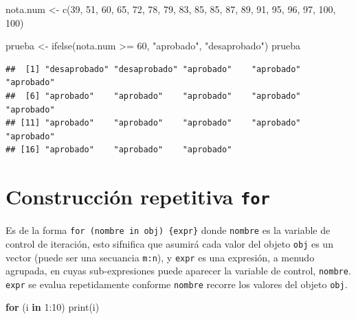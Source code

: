 \documentclass[
]{book}
\newenvironment{Shaded}{\begin{snugshade}}{\end{snugshade}}
\newcommand{\ControlFlowTok}[1]{\textcolor[rgb]{0.13,0.29,0.53}{\textbf{#1}}}
\newcommand{\DecValTok}[1]{\textcolor[rgb]{0.00,0.00,0.81}{#1}}
\newcommand{\FunctionTok}[1]{\textcolor[rgb]{0.00,0.00,0.00}{#1}}
\newcommand{\NormalTok}[1]{#1}
\newcommand{\OtherTok}[1]{\textcolor[rgb]{0.56,0.35,0.01}{#1}}
\newcommand{\SpecialCharTok}[1]{\textcolor[rgb]{0.00,0.00,0.00}{#1}}
\newcommand{\StringTok}[1]{\textcolor[rgb]{0.31,0.60,0.02}{#1}}
\begin{document}
\begin{Shaded}
\begin{Highlighting}[]
\NormalTok{nota.num }\OtherTok{\textless{}{-}}
  \FunctionTok{c}\NormalTok{(}\DecValTok{39}\NormalTok{, }\DecValTok{51}\NormalTok{, }\DecValTok{60}\NormalTok{, }\DecValTok{65}\NormalTok{, }\DecValTok{72}\NormalTok{, }\DecValTok{78}\NormalTok{, }\DecValTok{79}\NormalTok{, }\DecValTok{83}\NormalTok{, }\DecValTok{85}\NormalTok{, }\DecValTok{85}\NormalTok{, }\DecValTok{87}\NormalTok{, }\DecValTok{89}\NormalTok{, }\DecValTok{91}\NormalTok{, }\DecValTok{95}\NormalTok{, }\DecValTok{96}\NormalTok{, }\DecValTok{97}\NormalTok{, }\DecValTok{100}\NormalTok{, }\DecValTok{100}\NormalTok{)}

\NormalTok{prueba }\OtherTok{\textless{}{-}} \FunctionTok{ifelse}\NormalTok{(nota.num }\SpecialCharTok{\textgreater{}=} \DecValTok{60}\NormalTok{, }\StringTok{"aprobado"}\NormalTok{, }\StringTok{"desaprobado"}\NormalTok{)}
\NormalTok{prueba}
\end{Highlighting}
\end{Shaded}

\begin{verbatim}
##  [1] "desaprobado" "desaprobado" "aprobado"    "aprobado"    "aprobado"   
##  [6] "aprobado"    "aprobado"    "aprobado"    "aprobado"    "aprobado"   
## [11] "aprobado"    "aprobado"    "aprobado"    "aprobado"    "aprobado"   
## [16] "aprobado"    "aprobado"    "aprobado"
\end{verbatim}

\hypertarget{construcciuxf3n-repetitiva-for}{%
\section{\texorpdfstring{Construcción repetitiva \texttt{for}}{Construcción repetitiva for}}\label{construcciuxf3n-repetitiva-for}}

Es de la forma \texttt{for\ (nombre\ in\ obj)\ \{expr\}} donde \texttt{nombre} es la variable
de control de iteración, esto sifnifica que asumirá cada valor del objeto \texttt{obj}
es un vector (puede ser una secuancia \texttt{m:n}), y \texttt{expr} es una expresión, a
menudo agrupada, en cuyas sub-expresiones puede aparecer la variable de
control, \texttt{nombre}. \texttt{expr} se evalua repetidamente conforme \texttt{nombre} recorre
los valores del objeto \texttt{obj}.

\begin{Shaded}
\begin{Highlighting}[]
\ControlFlowTok{for}\NormalTok{ (i }\ControlFlowTok{in} \DecValTok{1}\SpecialCharTok{:}\DecValTok{10}\NormalTok{) }\FunctionTok{print}\NormalTok{(i)}
\end{Highlighting}
\end{Shaded}
\end{document}
